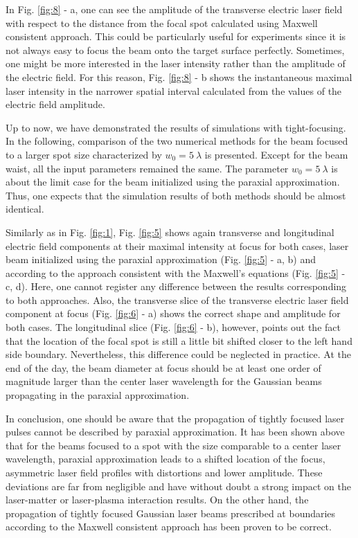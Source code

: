 In Fig. \ref{fig:8} - a, one can see the amplitude of the transverse electric laser field with respect to the distance from the focal spot calculated using Maxwell consistent approach. This could be particularly useful for experiments since it is not always easy to focus the beam onto the target surface perfectly. Sometimes, one might be more interested in the laser intensity rather than the amplitude of the electric field. For this reason, Fig. \ref{fig:8} - b shows the instantaneous maximal laser intensity in the narrower spatial interval calculated from the values of the electric field amplitude.

Up to now, we have demonstrated the results of simulations with tight-focusing. In the following, comparison of the two numerical methods for the beam focused to a larger spot size characterized by $ w_0 = 5 \ \lambda $ is presented. Except for the beam waist, all the input parameters remained the same. The parameter $ w_0 = 5 \ \lambda $ is about the limit case for the beam initialized using the paraxial approximation. Thus, one expects that the simulation results of both methods should be almost identical.

Similarly as in Fig. \ref{fig:1}, Fig. \ref{fig:5} shows again transverse and longitudinal electric field components at their maximal intensity at focus for both cases, laser beam initialized using the paraxial approximation (Fig. \ref{fig:5} - a, b) and according to the approach consistent with the Maxwell's equations (Fig. \ref{fig:5} - c, d). Here, one cannot register any difference between the results corresponding to both approaches. Also, the transverse slice of the transverse electric laser field component at focus (Fig. \ref{fig:6} - a) shows the correct shape and amplitude for both cases. The longitudinal slice (Fig. \ref{fig:6} - b), however, points out the fact that the location of the focal spot is still a little bit shifted closer to the left hand side boundary. Nevertheless, this difference could be neglected in practice. At the end of the day, the beam diameter at focus should be at least one order of magnitude larger than the center laser wavelength for the Gaussian beams propagating in the paraxial approximation.

In conclusion, one should be aware that the propagation of tightly focused laser pulses cannot be described by paraxial approximation. It has been shown above that for the beams focused to a spot with the size comparable to a center laser wavelength, paraxial approximation leads to a shifted location of the focus, asymmetric laser field profiles with distortions and lower amplitude. These deviations are far from negligible and have without doubt a strong impact on the laser-matter or laser-plasma interaction results. On the other hand, the propagation of tightly focused Gaussian laser beams prescribed at boundaries according to the Maxwell consistent approach has been proven to be correct.

